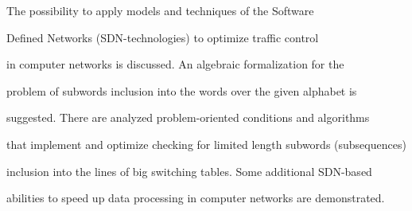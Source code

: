 \noindent


The possibility to apply models and techniques of the Software 


Defined Networks (SDN-technologies) to optimize traffic control 


in computer networks is discussed. An algebraic formalization for the 


problem of subwords inclusion into the words over the given alphabet is 


suggested. There are analyzed problem-oriented conditions and algorithms 


that implement and optimize checking for limited length subwords (subsequences) 


inclusion into the lines of big switching tables. Some additional SDN-based 


abilities to speed up data processing in computer networks are demonstrated.






















\def\leftkol{\ } %


\def\rightkol{\ } %








\def\tit{CHARACTERISTICS OF HARDWARE-BASED FIELD-PROGRAMMABLE GATE ARRAY IMPLEMENTATION 


OF~NETWORK TRAFFIC ANALYZER FOR~MALICIOUS CODE DETECTION}





\def\aut{M.~Samoylov$^1$, D.~Gamayunov$^2$, S.~Bezzubtsev$^3$, and~M.~Bulgakov$^4$}





